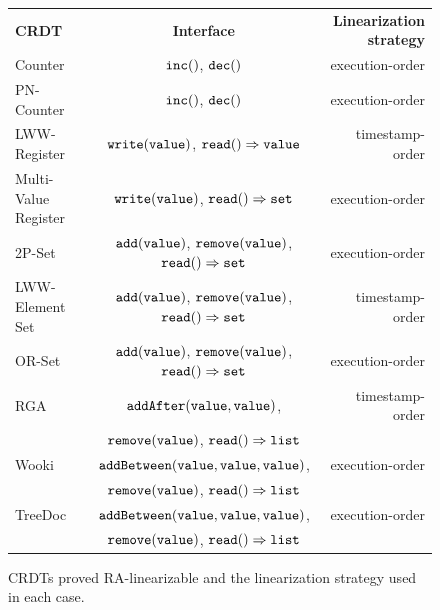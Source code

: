 \begin{figure}[t]
{\footnotesize
\begin{tabular}{|l|c|r|}
\hline
{\bf CRDT} & {\bf Interface} & {\bf Linearization strategy}\\
\hhline{|===|}
Counter~\cite{ShapiroPBZ11}&$\alabelshort[{\tt inc}]{}$, $\alabelshort[{\tt dec}]{}$ & execution-order \\
\hline
PN-Counter~\cite{ShapiroPBZ11}&$\alabelshort[{\tt inc}]{}$, $\alabelshort[{\tt dec}]{}$ & execution-order \\
\hline
LWW-Register~\cite{DBLP:journals/rfc/rfc677}&$\alabelshort[{\tt write}]{value}$, $\alabellong[{\tt read}]{}{value}{}$ & timestamp-order\\
\hline
Multi-Value Register~\cite{DBLP:conf/sosp/DeCandiaHJKLPSVV07}&$\alabelshort[{\tt write}]{value}$, $\alabellong[{\tt read}]{}{set}{}$ & execution-order\\
\hline
2P-Set~\cite{ShapiroPBZ11}&$\alabelshort[{\tt add}]{value}$, $\alabelshort[{\tt remove}]{value}$, $\alabellong[{\tt read}]{}{set}{}$ & execution-order\\
\hline
LWW-Element Set~\cite{ShapiroPBZ11}&$\alabelshort[{\tt add}]{value}$, $\alabelshort[{\tt remove}]{value}$, $\alabellong[{\tt read}]{}{set}{}$ & timestamp-order\\
\hline
OR-Set~\cite{ShapiroPBZ11}&$\alabelshort[{\tt add}]{value}$, $\alabelshort[{\tt remove}]{value}$, $\alabellong[{\tt read}]{}{set}{}$ & execution-order\\
\hline
RGA~\cite{RohJKL11}&$\alabelshort[{\tt addAfter}]{value,value}$, & timestamp-order
                \\ & $\alabelshort[{\tt remove}]{value}$, $\alabellong[{\tt read}]{}{list}{}$ & \\
\hline
Wooki~\cite{DBLP:conf/wise/WeissUM07}&$\alabelshort[{\tt addBetween}]{value,value,value}$, & execution-order
                \\ & $\alabelshort[{\tt remove}]{value}$, $\alabellong[{\tt read}]{}{list}{}$ & \\
\hline
TreeDoc~\cite{DBLP:conf/icdcs/PreguicaMSL09}&$\alabelshort[{\tt addBetween}]{value,value,value}$, & execution-order
                \\ & $\alabelshort[{\tt remove}]{value}$, $\alabellong[{\tt read}]{}{list}{}$ & \\
\hline
\end{tabular}
}
\caption{CRDTs proved RA-linearizable and the linearization strategy used in each case.}
\label{fig:crdt-implementaton of this paper, their correctness, and their interface}
\end{figure}

